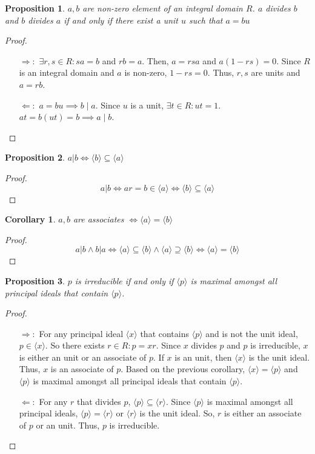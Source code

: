 \documentclass{article}
\newtheorem{pos}{Proposition}
\newtheorem{cor}{Corollary}[pos]
\theoremstyle{definition}\newtheorem{definition}{Definition}
\begin{document}
	\begin{pos}
		$a,b$ are non-zero element of an integral domain $R$. $a$ divides $b$ and $b$ divides $a$ if and only if there exist a unit $u$ such that $a=bu$
	\end{pos}
			
	\begin{proof}\
		\begin{itemize}
			\item [$\Rightarrow:$] $\exists r,s \in R : sa=b$ and $rb=a$. Then, $a=rsa$ and $a(1-rs)=0$. Since $R$ is an integral domain and $a$ is non-zero, $1-rs=0$. Thus, $r,s$ are units and $a=rb$.
			\item [$\Leftarrow:$] $a=bu \implies b \mid a$. Since $u$ is a unit, $\exists t \in R : ut=1$. $at=b(ut)=b \implies a \mid b$.
		\end{itemize}
	\end{proof}
	
	\begin{pos}
		$a|b \iff \langle b \rangle \subseteq \langle a \rangle$
	\end{pos}
	\begin{proof}
	$$a | b \iff ar=b \in \langle a \rangle \iff \langle b \rangle \subseteq \langle a \rangle$$
	\end{proof}
	
	\begin{cor}
		$a,b$ are associates $\iff \langle a \rangle = \langle b \rangle$
	\end{cor}	
	\begin{proof}
	$$a | b \land b|a \iff \langle a \rangle \subseteq \langle b \rangle \land \langle a \rangle \supseteq \langle b \rangle \iff \langle a \rangle = \langle b \rangle$$		
	\end{proof}
	
	\begin{pos}
		$p$ is irreducible if and only if $\langle p \rangle$ is maximal amongst all principal ideals that contain $\langle p \rangle$.
	\end{pos}
	
	\begin{proof}\
		\begin{itemize}
			\item [$\Rightarrow:$]	For any principal ideal $\langle x \rangle$ that contains $\langle p \rangle$ and is not the unit ideal, $p \in \langle x \rangle$. So there exists $ r \in R : p=xr$. Since $x$ divides $p$ and $p$ is irreducible, $x$ is either an unit or an associate of $p$. If $x$ is an unit, then $\langle x \rangle$ is the unit ideal. Thus, $x$ is an associate of $p$. Based on the previous corollary, $\langle x \rangle = \langle p \rangle$ and $\langle p \rangle$ is maximal amongst all principal ideals that contain $\langle p \rangle$.
			\item [$\Leftarrow:$]	For any $r$ that divides $p$,  $\langle p \rangle \subseteq \langle r \rangle$. Since $\langle p \rangle$ is maximal amongst all principal ideals, $\langle p \rangle = \langle r \rangle$ or $\langle r \rangle$ is the unit ideal. So, $r$ is either an associate of $p$ or an unit. Thus, $p$ is irreducible.
		\end{itemize}
	\end{proof}
	
\end{document}
